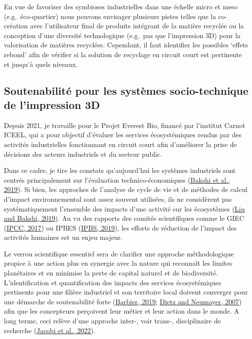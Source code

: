 \documentclass[
  12pt,
  oneside]{book}
\begin{document}
En vue de favoriser des symbioses industrielles dans une échelle micro et meso (e.g.~éco-quartier) nous pouvons envisager plusieurs pistes telles que la co-création avec l'utilisateur final de produits intégrant de la matière recyclée ou la conception d'une diversité technologique (e.g.~pas que l'impression 3D) pour la valorisation de matières recyclées.
Cependant, il faut identifier les possibles `effets rebond' afin de vérifier si la solution de recyclage en circuit court est pertinente et jusqu'à quels niveaux.

\hypertarget{soutenabilituxe9-pour-les-systuxe8mes-socio-technique-de-limpression-3d}{%
\subsection{Soutenabilité pour les systèmes socio-technique de l'impression 3D}\label{soutenabilituxe9-pour-les-systuxe8mes-socio-technique-de-limpression-3d}}

Depuis 2021, je travaille pour le Projet Everest Bio, financé par l'institut Carnot ICEEL, qui a pour objectif d'évaluer les services écosystémiques rendus par des activités industrielles fonctionnant en circuit court afin d'améliorer la prise de décisions des acteurs industriels et du secteur public.

Dans ce cadre, je tire les constats qu'aujourd'hui les systèmes industriels sont centrés principalement sur l'évaluation technico-économiques (\protect\hyperlink{ref-Bakshi2019b}{Bakshi et al., 2019}). Si bien, les approches de l'analyse de cycle de vie et de méthodes de calcul d'impact environnemental sont assez souvent utilisées, ils ne considèrent pas systématiquement l'ensemble des impacts d'une activité sur les écosystèmes (\protect\hyperlink{ref-Liu2019g}{Liu and Bakshi, 2019}). Au vu des rapports des comités scientifiques comme le GIEC (\protect\hyperlink{ref-IPCC2017}{IPCC, 2017}) ou IPBES (\protect\hyperlink{ref-IPBS2019}{IPBS, 2019}), les efforts de réduction de l'impact des activités humaines est un enjeu majeur.

Le verrou scientifique essentiel sera de clarifier une approche méthodologique propice à une action plus en synergie avec la nature qui reconnaît les limites planétaires et en minimise la perte de capital naturel et de biodiversité. L'identification et quantification des impacts des services écosystémiques pertinents pour une filière industriel et son territoire local doivent converger pour une démarche de soutenabilité forte (\protect\hyperlink{ref-Barbier2019}{Barbier, 2019}; \protect\hyperlink{ref-Dietz2006}{Dietz and Neumayer, 2007}) afin que les concepteurs perçoivent leur métier et leur action dans le monde. A long terme, ceci relève d'une approche inter-, voir trans-, disciplinaire de recherche (\protect\hyperlink{ref-Jacobi2022}{Jacobi et al., 2022}).
\end{document}
